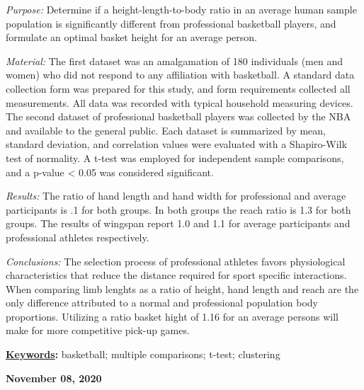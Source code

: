 \documentclass[]{article}
\renewenvironment{abstract}
 {{%
    \setlength{\leftmargin}{0mm}
    \setlength{\rightmargin}{\leftmargin}%
  }%
  \relax}
 {\endlist}
\begin{document}
\begin{abstract}

    \hbox{\vrule height .2pt width 39.14pc}

    \vskip 8.5pt %

\noindent \noindent \emph{Purpose:} Determine if a height-length-to-body ratio in
an average human sample population is significantly different from
professional basketball players, and formulate an optimal basket height
for an average person.\vspace{0.25in}

\noindent \emph{Material:} The first dataset was an amalgamation of 180
individuals (men and women) who did not respond to any affiliation with
basketball. A standard data collection form was prepared for this study,
and form requirements collected all measurements. All data was recorded
with typical household measuring devices. The second dataset of
professional basketball players was collected by the NBA and available
to the general public. Each dataset is summarized by mean, standard
deviation, and correlation values were evaluated with a Shapiro-Wilk
test of normality. A t-test was employed for independent sample
comparisons, and a p-value \textless{} 0.05 was considered significant.
\vspace{0.25in}

\noindent \emph{Results:} The ratio of hand length and hand width for
professional and average participants is .1 for both groups. In both
groups the reach ratio is 1.3 for both groups. The results of wingspan
report 1.0 and 1.1 for average participants and professional athletes
respectively. \vspace{0.25in}

\noindent \emph{Conclusions:} The selection process of professional
athletes favors physiological characteristics that reduce the distance
required for sport specific interactions. When comparing limb lenghts as
a ratio of height, hand length and reach are the only difference
attributed to a normal and professional population body proportions.
Utilizing a ratio basket hight of 1.16 for an average persons will make
for more competitive pick-up games. \vspace{0.25in}


\vskip 8.5pt \noindent \textbf{\underline{Keywords}:} basketball; multiple comparisons; t-test; clustering \par

    




    
    \hbox{\vrule height .2pt width 39.14pc}
    \vskip 5pt 
    \hfill \textbf{\textcolor{WSU.gray}{ November 08, 2020 } }
    \vskip 5pt 
    
\end{abstract}
\end{document}
